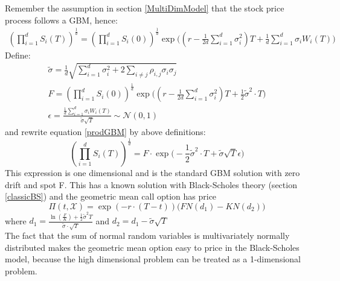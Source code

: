 Remember the assumption in section \ref{MultiDimModel} that the stock price process follows a GBM, hence:
\begin{equation}\label{prodGBM}
\begin{split}
(\prod_{i=1}^{d} S_i(T))^{\frac{1}{d}} = (\prod_{i=1}^{d} S_i(0))^{\frac{1}{d}} \exp\bigg((r-\frac{1}{2d}\sum_{i=1}^{d}\sigma_i^2)T + \frac{1}{d} \sum_{i=1}^{d} \sigma_i W_i(T) \bigg)
\end{split}
\end{equation}
Define:
\begin{align*}
\tilde{\sigma} = \frac{1}{d} \sqrt{\sum_{i=1}^{d} \sigma_i^2 + 2 \sum_{i\neq j} \rho_{i,j} \sigma_i \sigma_j}\\
F=(\prod_{i=1}^{d} S_i(0))^{\frac{1}{d}} \exp\bigg((r-\frac{1}{2d}\sum_{i=1}^{d}\sigma_i^2)T + \frac{1}{2} \tilde{\sigma}^2 \cdot T \bigg)\\
\epsilon = \frac{\frac{1}{d} \sum_{i=1}^{d} \sigma_i W_i(T)}{\tilde{\sigma} \sqrt{T}} \sim \mathcal{N}(0,1)
\end{align*}
and rewrite equation \eqref{prodGBM} by above definitions:
$$(\prod_{i=1}^{d} S_i(T))^{\frac{1}{d}} = F \cdot \exp\bigg( -\frac{1}{2} \tilde{\sigma}^2 \cdot T + \tilde{\sigma} \sqrt{T} \epsilon \bigg)$$
This expression is one dimensional and is the standard GBM solution with zero drift and spot F. This has a known solution with Black-Scholes theory (section \ref{classicBS}) and the geometric mean call option has price
\begin{equation*}
\Pi(t,\mathcal{X})=\exp(-r \cdot (T-t))\bigg(F N(d_1) - K N(d_2) \bigg)
\end{equation*}
where $d_1=\frac{\ln(\frac{F}{K}) + \frac{1}{2} \tilde{\sigma}^2 T}{\tilde{\sigma} \cdot \sqrt{T}}$ and $d_2=d_1-\tilde{\sigma} \sqrt{T}$\\

The fact that the sum of normal random variables is multivariately normally distributed makes the geometric mean option easy to price in the Black-Scholes model, because the high dimensional problem can be treated as a 1-dimensional problem.

